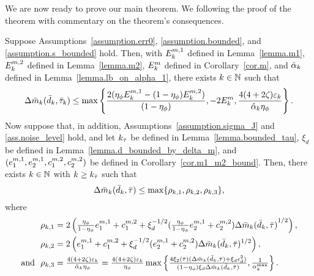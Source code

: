 We are now ready to prove our main theorem.  We following the proof of the theorem with commentary on the theorem's consequences.

\begin{theorem}\label{thm.main1}
  Suppose Assumptions~\ref{assumption.err0}, \ref{assumption.bounded}, and \ref{assumption.s_bounded} hold.  Then, with $E_k^{m, 1}$ defined in Lemma~\ref{lemma.m1}, $E_k^{m, 2}$ defined in Lemma~\ref{lemma.m2}, $E_k^m$ defined in Corollary~\ref{cor.m}, and ${\hat \alpha}_k$ defined in Lemma~\ref{lemma.lb_on_alpha_1}, there exists $k \in \mathbb{N}$ such that
  \begin{equation}\label{eq.stat_cond_0}
    \Delta {\bar m}_k({\bar d}_k, {\bar \tau}_k) \leq \max\left\{\frac{2(\eta_\phi E_k^{m, 1} - (1 - \eta_\phi) E_k^{m, 2})}{(1 - \eta_\phi)}, - 2 E_k^m, \frac{4(4+2\zeta) \varepsilon_k}{{\hat \alpha}_k \eta_\phi }  \right\}.
  \end{equation}
  Now suppose that, in addition, Assumptions~\ref{assumption.sigma_J} and \ref{ass.noise_level} hold, and let $k_{{\bar \tau}}$ be defined in Lemma~\ref{lemma.bounded_tau}, $\xi_d$ be defined in Lemma~\ref{lemma.d_bounded_by_delta_m}, and $(e_1^{m, 1}, e_2^{m, 1}, c_1^{m, 2}, c_2^{m, 2})$ be defined in Corollary~\ref{cor.m1_m2_bound}.  Then, there exists $k \in \mathbb{N}$ with $k \geq k_{{\bar \tau}}$ such that
  \begin{equation}\label{eq.stat_cond_0_v3}
    \Delta {\bar m}_k({\bar d}_k, {\bar \tau}) \leq \max\{\rho_{k,1}, \rho_{k,2}, \rho_{k,3} \},  
  \end{equation}
  where
  \begin{align*}
    \rho_{k,1} &= 2 \left( \tfrac{\eta_{\phi}}{1 - \eta_{\phi}} \emOneOne +  \emTwoOne + \xi_d^{-1/2} (\tfrac{\eta_{\phi}}{1 - \eta_{\phi}} \emOneTwo + \emTwoTwo )  {\Delta \mtrue_k(\dtrue_k, \tautrue) }^{1/2} \right), \\
    \rho_{k,2} &= 2 \left( \emOneOne + \emTwoOne + \xi_d^{-1/2} (\emOneTwo + \emTwoTwo) \Delta  \mtrue_k(\dtrue_k, \tautrue)^{1/2} \right), \\ \text{and}\ \ 
    \rho_{k,3} &= \tfrac{4(4 + 2\zeta) \vareps_k}{\alphabar_k \eta_\phi} = \tfrac{4(4 + 2\zeta) \vareps_k}{\eta_\phi} \max \left \{ \tfrac{4 \xizero{\tautrue} (\Delta \mtrue_k(\dtrue_k, \tautrue) + \xi_d\eps_d^2)}{(1 - \eta_\phi) \xi_d \Delta \mtrue_k(\dtrue_k, \tautrue)}, \tfrac{1}{\alpha_k^{\max}} \right\}.     
  \end{align*}
\end{theorem}

